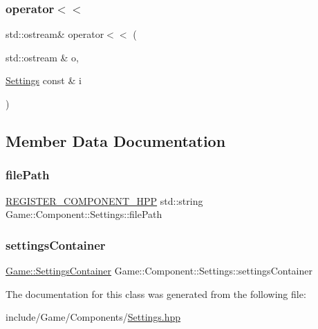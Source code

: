 \subsubsection{\texorpdfstring{operator$<$$<$}{operator<<}}
{\footnotesize\ttfamily std\+::ostream\& operator$<$$<$ (\begin{DoxyParamCaption}\item[{std\+::ostream \&}]{o,  }\item[{\mbox{\hyperlink{class_game_1_1_component_1_1_settings}{Settings}} const \&}]{i }\end{DoxyParamCaption})\hspace{0.3cm}{\ttfamily [friend]}}



\subsection{Member Data Documentation}
\mbox{\label{class_game_1_1_component_1_1_settings_ac8443df701a872a580cfad5e6a6d9fcc}} 
\subsubsection{\texorpdfstring{file\+Path}{filePath}}
{\footnotesize\ttfamily \mbox{\hyperlink{_core_8hpp_a895cfc16b36b6c309f80b98ded63df4f}{R\+E\+G\+I\+S\+T\+E\+R\+\_\+\+C\+O\+M\+P\+O\+N\+E\+N\+T\+\_\+\+H\+PP}} std\+::string Game\+::\+Component\+::\+Settings\+::file\+Path}

\mbox{\label{class_game_1_1_component_1_1_settings_a89bf0344b96da55d2cac38cda9b2faaa}} 
\subsubsection{\texorpdfstring{settings\+Container}{settingsContainer}}
{\footnotesize\ttfamily \mbox{\hyperlink{class_game_1_1_settings_container}{Game\+::\+Settings\+Container}} Game\+::\+Component\+::\+Settings\+::settings\+Container}



The documentation for this class was generated from the following file\+:\begin{DoxyCompactItemize}
\item 
include/\+Game/\+Components/\mbox{\hyperlink{_settings_8hpp}{Settings.\+hpp}}\end{DoxyCompactItemize}
